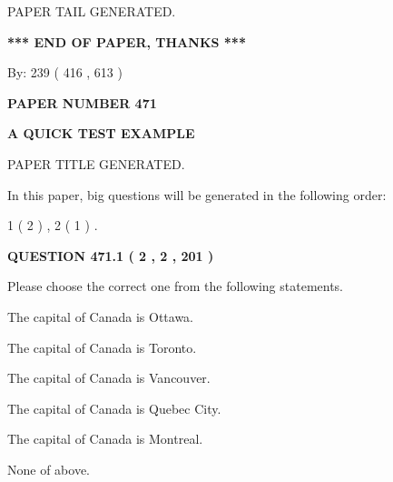 \documentclass[12pt]{article}
\begin{document}
\vspace{2.0in} PAPER TAIL GENERATED.
   
   
   
   
\vspace{1.0in} 
{\textbf{\large{ *** END OF PAPER, THANKS *** }}} 
   
   
\hspace{1.0in} By: 
 239 ( 416 ,  613 )
   
   
   
   
\newpage 
\setcounter{page}{ 
   471001 } 
   
   
   
   
 {\textbf{ \Large{ PAPER NUMBER  471  }}}
   
   
\vspace{0.2in}
   
   
   
   
   
   
   
   
 \vspace{0.2in}
{\LARGE {\textbf{ A QUICK TEST EXAMPLE}}}
   
   
 PAPER TITLE GENERATED.
   
   
   
\vspace{0.2in}
   
In this paper, big questions will be generated in the following order: 
   
   
   1 ( 2 )
 ,
   2 ( 1 )
 .
  
\vspace{0.2in}
  
{\textbf{\Large{QUESTION
471.1 
 ( 2 , 2 , 201 )
}}}
  
  
Please choose the correct one from the following statements.
 
 
The capital of Canada is Ottawa.
 
 
The capital of Canada is Toronto.
 
 
The capital of Canada is Vancouver.
 
 
The capital of Canada is Quebec City.
 
 
The capital of Canada is Montreal.
 
 
 None of above.
 
\end{document}
